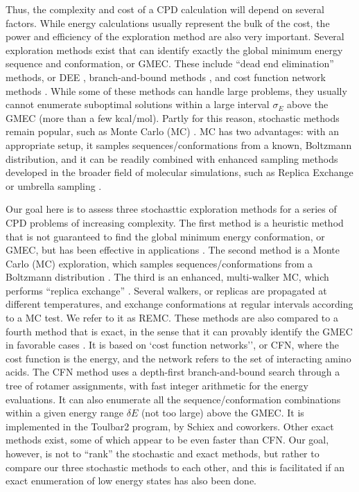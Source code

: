\documentclass[a4paper,12pt]{article}
\begin{document}
Thus, the complexity and cost of a CPD calculation will depend on several factors. While energy calculations
usually represent the bulk of the cost, the power and efficiency of the exploration method are also very important.
Several exploration methods exist that can identify exactly the global minimum energy sequence and conformation,
or GMEC. These include ``dead end elimination'' methods, or DEE \cite{Looger01,Georgiev08}, branch-and-bound methods
\cite{Gordon99,Hong09}, and cost function network methods \cite{Traore13,Allouche14}. While some of these methods
can handle large problems, they usually cannot enumerate suboptimal solutions within a large interval $\sigma_E$
above the GMEC (more than a few kcal/mol). Partly for this reason, stochastic methods remain popular, such as Monte
Carlo (MC) \cite{Zou03,Samish11}. MC has two advantages: with an appropriate setup, it samples sequences/conformations
from a known, Boltzmann distribution, and it can be readily combined with enhanced sampling methods developed in the
broader field of molecular simulations, such as Replica Exchange or umbrella sampling \cite{FrenkelBK,ChipotBK}. 

Our goal here is to assess three stochasttic exploration methods for a series of CPD problems of increasing complexity.
The first method is a heuristic method that is not guaranteed to find the global minimum energy conformation, or GMEC,
but has been effective in applications \cite{Wernisch00,Schmidt09,Schmidt10}. The second method is a Monte Carlo (MC)
exploration, which samples sequences/conformations from a Boltzmann distribution \cite{Metropolis53,FrenkelBK,GrimmetBK}.
The third is an enhanced, multi-walker MC, which performs ``replica exchange'' \cite{Sugita99,Kofke02,Earl05}. Several
walkers, or replicas are propagated at different temperatures, and exchange conformations at regular intervals according
to a MC test. We refer to it as REMC. These methods are also compared to a fourth method that is exact, in the sense that
it can provably identify the GMEC in favorable cases \cite{Traore13,Allouche14}. It is based on `cost function networks'',
or CFN, where the cost function is the energy, and the network refers to the set of interacting amino acids. The CFN method
uses a depth-first branch-and-bound search through a tree of rotamer assignments, with fast integer arithmetic for the energy
evaluations. It can also enumerate all the sequence/conformation combinations within a given energy range $\delta E$ (not
too large) above the GMEC. It is implemented in the Toulbar2 program, by Schiex and coworkers. Other exact methods exist,
some of which appear to be even faster than CFN. Our goal, however, is not to ``rank'' the stochastic and exact methods,
but rather to compare our three stochastic methods to each other, and this is facilitated if an exact enumeration of 
low energy states has also been done.
\end{document}
